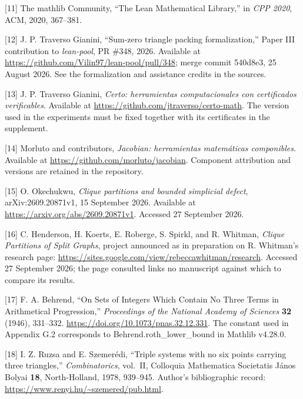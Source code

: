 \documentclass[english,11pt,a4paper]{article}
\begin{document}
{[}11{]} The mathlib Community, ``The Lean Mathematical Library,'' in \emph{CPP 2020}, ACM, 2020, 367--381.

{[}12{]} J. P. Traverso Gianini, ``Sum-zero triangle packing formalization,'' Paper III contribution to \emph{lean-pool}, PR \#348, 2026. Available at \url{https://github.com/Vilin97/lean-pool/pull/348}; merge commit {\ttfamily\small 540d8e3}, 25 August 2026. See the formalization and assistance credits in the sources.

{[}13{]} J. P. Traverso Gianini, \emph{Certo: herramientas computacionales con certificados verificables}. Available at \url{https://github.com/jtraverso/certo-math}. The version used in the experiments must be fixed together with its certificates in the supplement.

{[}14{]} Morluto and contributors, \emph{Jacobian: herramientas matemáticas componibles}. Available at \url{https://github.com/morluto/jacobian}. Component attribution and versions are retained in the repository.

{[}15{]} O. Okechukwu, \emph{Clique partitions and bounded simplicial defect}, arXiv:2609.20871v1, 15 September 2026. Available at \url{https://arxiv.org/abs/2609.20871v1}. Accessed 27 September 2026.

{[}16{]} C. Henderson, H. Koerts, E. Roberge, S. Spirkl, and R. Whitman, \emph{Clique Partitions of Split Graphs}, project announced as in preparation on R. Whitman's research page: \url{https://sites.google.com/view/rebeccawhitman/research}. Accessed 27 September 2026; the page consulted links no manuscript against which to compare its results.

{[}17{]} F. A. Behrend, ``On Sets of Integers Which Contain No Three Terms in Arithmetical Progression,'' \emph{Proceedings of the National Academy of Sciences} \textbf{32} (1946), 331--332. \url{https://doi.org/10.1073/pnas.32.12.331}. The constant used in Appendix G.2 corresponds to {\ttfamily\small Behrend.\discretionary{\hbox{\ensuremath{\hookrightarrow}}}{}{}roth\_\discretionary{\hbox{\ensuremath{\hookrightarrow}}}{}{}lower\_\discretionary{\hbox{\ensuremath{\hookrightarrow}}}{}{}bound} in Mathlib v4.28.0.

{[}18{]} I. Z. Ruzsa and E. Szemerédi, ``Triple systems with no six points carrying three triangles,'' \emph{Combinatorics}, vol.~II, Colloquia Mathematica Societatis János Bolyai \textbf{18}, North-Holland, 1978, 939--945. Author's bibliographic record: \url{https://www.renyi.hu/~szemered/pub.html}.
\end{document}
